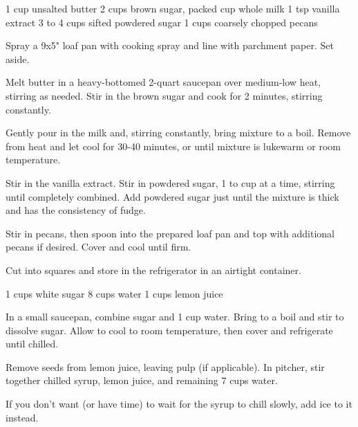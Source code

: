 \begin{ingreds}
  1 cup unsalted butter
  2 cups brown sugar, packed
   cup whole milk
  1 tsp vanilla extract
  3  to 4 cups sifted powdered sugar
  1  cups coarsely chopped pecans
\end{ingreds}
\begin{method}
  Spray a 9x5" loaf pan with cooking spray
  and line with parchment paper.
  Set aside.

  Melt butter in a heavy-bottomed 2-quart saucepan
  over \linebreak medium-low heat, stirring as needed.
  Stir in the brown sugar and cook for
  2 minutes, stirring constantly.

  Gently pour in the milk and, stirring constantly,
  bring mixture to a boil.
  Remove from heat and let cool for 30-40 minutes,
  or until mixture is lukewarm or room temperature.

  Stir in the vanilla extract.
  Stir in powdered sugar, 1 to  cup
  at a time, stirring until completely combined.
  Add powdered sugar just until the mixture is
  thick and has the consistency of fudge.

  Stir in pecans, then spoon into the prepared
  loaf pan and top with additional pecans if desired.
  Cover and cool until firm.

  Cut into squares and store in the refrigerator
  in an airtight container.
\end{method}

\vegan
\begin{ingreds}
  1  cups white sugar
  8 cups water
  1  cups lemon juice
\end{ingreds}

\begin{method}
  In a small saucepan, combine sugar and 1 cup water.
  Bring to a boil and stir to dissolve sugar.
  Allow to cool to room temperature, then cover
  and refrigerate until chilled.

  Remove seeds from lemon juice, leaving pulp (if applicable).
  In pitcher, stir together chilled syrup, lemon juice,
  and remaining 7 cups water.
\end{method}
\begin{tips}
  If you don't want (or have time) to wait
  for the syrup to chill slowly,
  add ice to it instead.
\end{tips}

